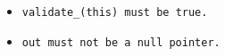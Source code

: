 \begin{itemize}[nosep]

\item \tt{validate_(this)} must be \tt{true}.

\item \tt{out} must not be a null pointer.

\end{itemize}
